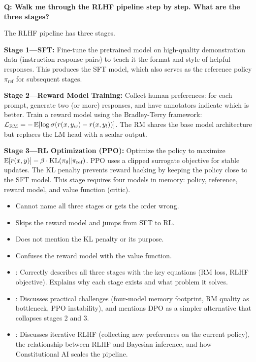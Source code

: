 \begin{interviewq}
\textbf{Q: Walk me through the RLHF pipeline step by step.  What are the
three stages?}

 \quad {} \quad
\badgefreq{\freqhigh}

\stronganswer
The RLHF pipeline has three stages.

\textbf{Stage 1---SFT:} Fine-tune the pretrained model on high-quality
demonstration data (instruction-response pairs) to teach it the format and
style of helpful responses.  This produces the SFT model, which also serves
as the reference policy $\pi_{\text{ref}}$ for subsequent stages.

\textbf{Stage 2---Reward Model Training:} Collect human preferences: for
each prompt, generate two (or more) responses, and have annotators indicate
which is better.  Train a reward model using the Bradley-Terry framework:
$\mathcal{L}_{\text{RM}} = -\operatorname{\mathbb{E}}[\log \sigma(r(x, y_w) - r(x, y_l))]$.
The RM shares the base model architecture but replaces the LM head with a
scalar output.

\textbf{Stage 3---RL Optimization (PPO):} Optimize the policy to maximize
$\operatorname{\mathbb{E}}[r(x, y)] - \beta \cdot \operatorname{KL}(\pi_\theta \| \pi_{\text{ref}})$.  PPO
uses a clipped surrogate objective for stable updates.  The KL penalty
prevents reward hacking by keeping the policy close to the SFT model.
This stage requires four models in memory: policy, reference, reward model,
and value function (critic).

\redflags
\begin{itemize}
\item Cannot name all three stages or gets the order wrong.
\item Skips the reward model and jumps from SFT to RL.
\item Does not mention the KL penalty or its purpose.
\item Confuses the reward model with the value function.
\end{itemize}


\goodgreat
\begin{itemize}
\item {}: Correctly describes all three stages with the
  key equations (RM loss, RLHF objective).  Explains why each stage
  exists and what problem it solves.
\item {}: Discusses practical challenges (four-model memory
  footprint, RM quality as bottleneck, PPO instability), and mentions
  DPO as a simpler alternative that collapses stages 2 and 3.
\item {}: Discusses iterative RLHF (collecting new
  preferences on the current policy), the relationship between RLHF
  and Bayesian inference, and how Constitutional AI scales the pipeline.
\end{itemize}


\end{interviewq}
